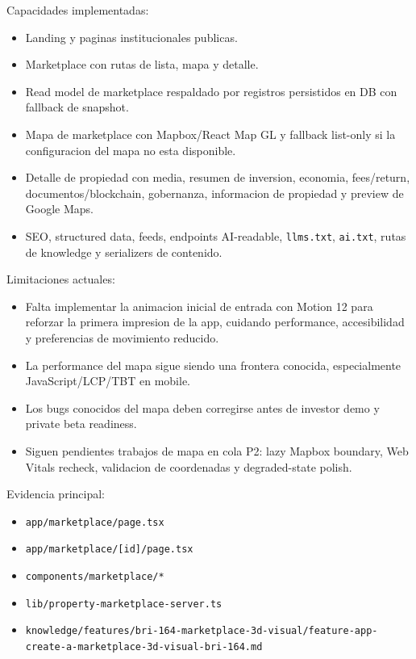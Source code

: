 \documentclass[
  10pt,
  letterpaper,
]{article}
\providecommand{\tightlist}{%
  \setlength{\itemsep}{0pt}\setlength{\parskip}{0pt}}
\let\oldtexttt\texttt
\renewcommand{\texttt}[1]{\oldtexttt{\small #1}}
\begin{document}
Capacidades implementadas:

\begin{itemize}
\tightlist
\item
  Landing y paginas institucionales publicas.
\item
  Marketplace con rutas de lista, mapa y detalle.
\item
  Read model de marketplace respaldado por registros persistidos en DB
  con fallback de snapshot.
\item
  Mapa de marketplace con Mapbox/React Map GL y fallback list-only si la
  configuracion del mapa no esta disponible.
\item
  Detalle de propiedad con media, resumen de inversion, economia,
  fees/return, documentos/blockchain, gobernanza, informacion de
  propiedad y preview de Google Maps.
\item
  SEO, structured data, feeds, endpoints AI-readable, \texttt{llms.txt},
  \texttt{ai.txt}, rutas de knowledge y serializers de contenido.
\end{itemize}

Limitaciones actuales:

\begin{itemize}
\tightlist
\item
  Falta implementar la animacion inicial de entrada con Motion 12 para
  reforzar la primera impresion de la app, cuidando performance,
  accesibilidad y preferencias de movimiento reducido.
\item
  La performance del mapa sigue siendo una frontera conocida,
  especialmente JavaScript/LCP/TBT en mobile.
\item
  Los bugs conocidos del mapa deben corregirse antes de investor demo y
  private beta readiness.
\item
  Siguen pendientes trabajos de mapa en cola P2: lazy Mapbox boundary,
  Web Vitals recheck, validacion de coordenadas y degraded-state polish.
\end{itemize}

Evidencia principal:

\begin{itemize}
\tightlist
\item
  \texttt{app/marketplace/page.tsx}
\item
  \texttt{app/marketplace/{[}id{]}/page.tsx}
\item
  \texttt{components/marketplace/*}
\item
  \texttt{lib/property-marketplace-server.ts}
\item
  \texttt{knowledge/features/bri-164-marketplace-3d-visual/feature-app-create-a-marketplace-3d-visual-bri-164.md}
\end{itemize}
\end{document}
